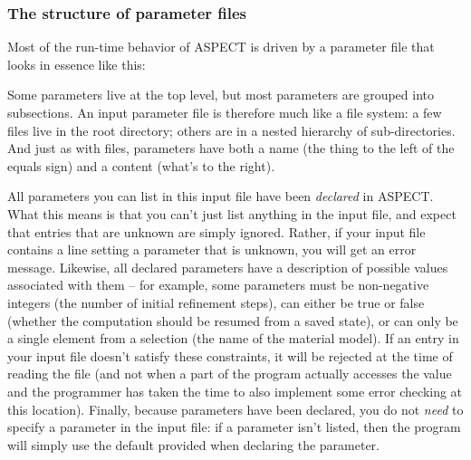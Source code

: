 \documentclass{article}
\newcommand{\aspect}{\textsc{ASPECT}}
\begin{document}
\subsubsection{The structure of parameter files}

Most of the run-time behavior of \aspect{} is driven by a parameter file that
looks in essence like this:


Some parameters live at the top level, but most parameters are grouped into
subsections. An input parameter file is therefore much like a file system: a
few files live in the root directory; others are in a nested hierarchy of
sub-directories. And just as with files, parameters have both a name (the
thing to the left of the equals sign) and a content (what's to the right).

All parameters you can list in this input file have been \textit{declared} in
\aspect. What this means is that you can't just list anything in the input
file, and expect that entries that are unknown are simply ignored.
Rather, if your input file contains a line setting a parameter that is unknown, you
will get an error message. Likewise, all declared parameters have a
description of possible values associated with them -- for example, some
parameters must be non-negative integers (the number of initial refinement
steps), can either be true or false (whether the computation should be resumed
from a saved state), or can only be a single element from a selection (the
name of the material model). If an entry in your input file doesn't satisfy
these constraints, it will be rejected at the time of reading the file (and
not when a part of the program actually accesses the value and the programmer
has taken the time to also implement some error checking at this location).
Finally, because parameters have been declared, you do not \textit{need} to
specify a parameter in the input file: if a parameter isn't listed, then the
program will simply use the default provided when declaring the parameter.
\end{document}
